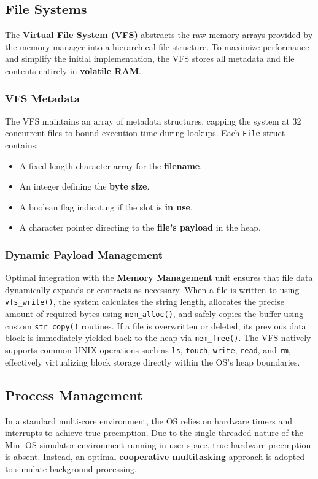 \documentclass[conference]{IEEEtran}
\begin{document}
\subsection{File Systems}
The \textbf{Virtual File System (VFS)} abstracts the raw memory arrays provided by the memory manager into a hierarchical file structure. To maximize performance and simplify the initial implementation, the VFS stores all metadata and file contents entirely in \textbf{volatile RAM}.

\subsubsection{\textbf{VFS Metadata}}
The VFS maintains an array of metadata structures, capping the system at 32 concurrent files to bound execution time during lookups. Each \texttt{File} struct contains:
\begin{itemize}
    \item A fixed-length character array for the \textbf{filename}.
    \item An integer defining the \textbf{byte size}.
    \item A boolean flag indicating if the slot is \textbf{in use}.
    \item A character pointer directing to the \textbf{file's payload} in the heap.
\end{itemize}

\subsubsection{\textbf{Dynamic Payload Management}}
Optimal integration with the \textbf{Memory Management} unit ensures that file data dynamically expands or contracts as necessary. When a file is written to using \texttt{vfs\_write()}, the system calculates the string length, allocates the precise amount of required bytes using \texttt{mem\_alloc()}, and safely copies the buffer using custom \texttt{str\_copy()} routines. If a file is overwritten or deleted, its previous data block is immediately yielded back to the heap via \texttt{mem\_free()}. The VFS natively supports common UNIX operations such as \texttt{ls}, \texttt{touch}, \texttt{write}, \texttt{read}, and \texttt{rm}, effectively virtualizing block storage directly within the OS's heap boundaries.

\subsection{Process Management}
In a standard multi-core environment, the OS relies on hardware timers and interrupts to achieve true preemption. Due to the single-threaded nature of the Mini-OS simulator environment running in user-space, true hardware preemption is absent. Instead, an optimal \textbf{cooperative multitasking} approach is adopted to simulate background processing.
\end{document}
